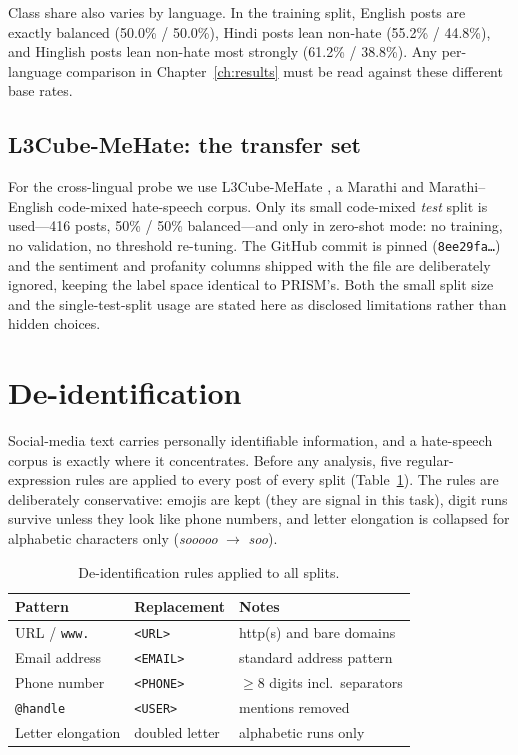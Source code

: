 Class share also varies by language. In the training split, English posts are
exactly balanced (50.0\% / 50.0\%), Hindi posts lean non-hate (55.2\% / 44.8\%),
and Hinglish posts lean non-hate most strongly (61.2\% / 38.8\%). Any
per-language comparison in Chapter~\ref{ch:results} must be read against these
different base rates.

\subsection{L3Cube-MeHate: the transfer set}
For the cross-lingual probe we use L3Cube-MeHate \cite{mehate}, a Marathi and
Marathi--English code-mixed hate-speech corpus. Only its small code-mixed
\emph{test} split is used---416 posts, 50\% / 50\% balanced---and only in zero-shot
mode: no training, no validation, no threshold re-tuning. The GitHub commit is
pinned (\texttt{8ee29fa\ldots}) and the sentiment and profanity columns shipped
with the file are deliberately ignored, keeping the label space identical to
PRISM's. Both the small split size and the single-test-split usage are stated
here as disclosed limitations rather than hidden choices.

\section{De-identification}
\label{sec:deid}

Social-media text carries personally identifiable information, and a hate-speech
corpus is exactly where it concentrates. Before any analysis, five
regular-expression rules are applied to every post of every split
(Table~\ref{tab:deid}). The rules are deliberately conservative: emojis are kept
(they are signal in this task), digit runs survive unless they look like phone
numbers, and letter elongation is collapsed for alphabetic characters only
(\emph{sooooo} $\rightarrow$ \emph{soo}).

\begin{table}[htbp]
\centering
\caption{De-identification rules applied to all splits.}
\label{tab:deid}
\small
\begin{tabular}{llp{6.2cm}}
\toprule
Pattern & Replacement & Notes \\
\midrule
URL / \texttt{www.} & \texttt{<URL>} & http(s) and bare domains \\
Email address & \texttt{<EMAIL>} & standard address pattern \\
Phone number & \texttt{<PHONE>} & $\geq$8 digits incl.\ separators \\
\texttt{@handle} & \texttt{<USER>} & mentions removed \\
Letter elongation & doubled letter & alphabetic runs only \\
\bottomrule
\end{tabular}
\end{table}

